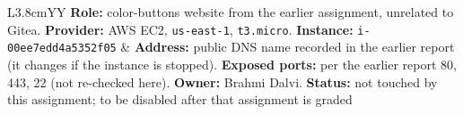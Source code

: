 \begin{tabularx}{\linewidth}{L{3.8cm}YY}
\small \textbf{Role:} color-buttons website from the earlier assignment, unrelated to Gitea.\newline
\textbf{Provider:} AWS EC2, \texttt{us-east-1}, \texttt{t3.micro}.\newline
\textbf{Instance:} \texttt{i-00ee7edd4a5352f05} &
\small \textbf{Address:} public DNS name recorded in the earlier report (it changes if the instance is stopped).\newline
\textbf{Exposed ports:} per the earlier report 80, 443, 22 (not re-checked here).\newline
\textbf{Owner:} Brahmi Dalvi.\newline
\textbf{Status:} not touched by this assignment; to be disabled after that assignment is graded\\
\end{tabularx}

